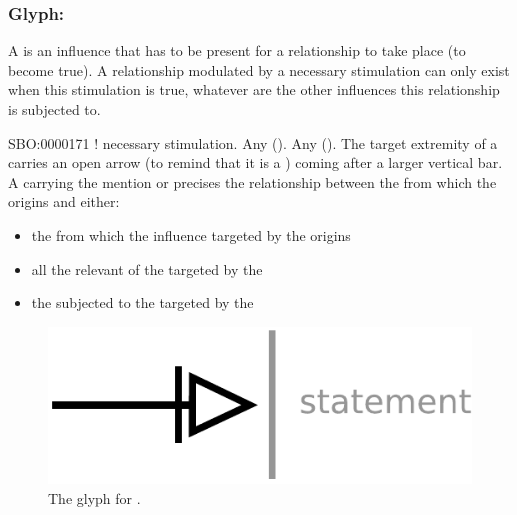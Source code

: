 
\subsubsection{Glyph: }\label{sec:necessaryStimulation}

A  is an influence that has to be present for a relationship to take place (to become true). A relationship modulated by a necessary stimulation can only exist when this stimulation is true, whatever are the other influences this relationship is subjected to.

\begin{glyphDescription}
 \glyphSboTerm SBO:0000171 ! necessary stimulation.
 \glyphOrigin Any  ().
 \glyphTarget Any  ().
 \glyphEndPoint The target extremity of a  carries an open arrow (to remind that it is a ) coming after a larger vertical bar.
 \glyphAux A  carrying the mention  or  precises the relationship between the  from which the  origins and either:
\begin{itemize}
\item the  from which the influence targeted by the  origins
\item all the relevant  of the  targeted by the 
\item the  subjected to the  targeted by the 
\end{itemize}

 \end{glyphDescription}

\begin{figure}[H]
  \centering
  \includegraphics[scale = 0.5]{images/necessaryStimulation}
  \caption{The \ER glyph for .}
  \label{fig:necessaryStimulation}
\end{figure}


